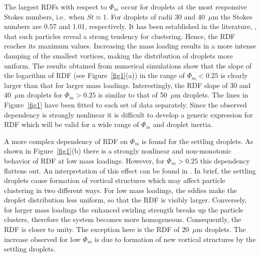 \documentclass[../thesis.tex]{subfiles}
\begin{document}
The largest RDFs with respect to $\Phi_m$ occur for droplets at the most responsive Stokes numbers, i.e.\ when $St\approx1$. For droplets of radii 30 and 40~$\mu$m the Stokes numbers are 0.57 and 1.01, respectively. It has been established in the literature, \citep[e.g.][]{GW13}, that such particles reveal a strong tendency for clustering. Hence, the RDF reaches its maximum values. Increasing the mass loading results in a more intense damping of the smallest vortices, making the distribution of droplets more uniform. The results obtained from numerical simulations show that the slope of the logarithm of RDF (see Figure~\ref{fig1}(a)) in the range of $\Phi_m < 0.25$ is clearly larger than that for larger mass loadings. Interestingly, the RDF slope of 30 and 40~$\mu$m droplets for $\Phi_m > 0.25$ is similar to that of 50~$\mu$m droplets. The lines in Figure~\ref{fig1} have been fitted to each set of data separately. Since the observed dependency is strongly nonlinear it is difficult to develop a generic expression for RDF which will be valid for a wide range of $\Phi_m$ and droplet inertia. %

A more complex dependency of RDF on $\Phi_m$ is found for the settling droplets. As shown in Figure~\ref{fig1}(b) there is a strongly nonlinear and non-monotonic behavior of RDF at low mass loadings. However, for $\Phi_m>0.25$ this dependency flattens out. An interpretation of this effect can be found in \cite{RPW20}. In brief, the settling droplets cause formation of vortical structures which may affect particle clustering in two different ways. For low mass loadings, the eddies make the droplet distribution less uniform, so that the RDF is visibly larger. Conversely, for larger mass loadings the enhanced swirling strength breaks up the particle clusters, therefore the system becomes more homogeneous. Consequently, the RDF is closer to unity. The exception here is the RDF of 20~$\mu$m droplets. The increase observed for low $\Phi_m$ is due to formation of new vortical structures by the settling droplets.
\end{document}

